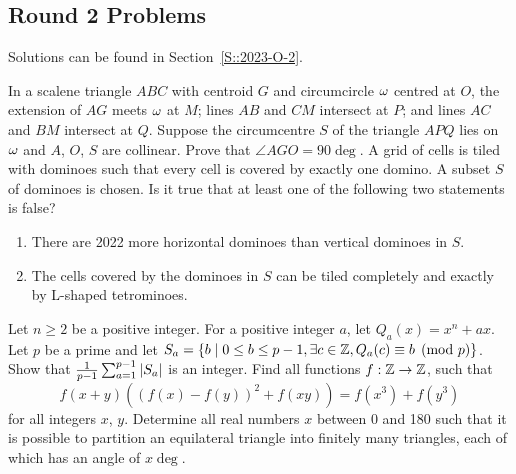 \subsection{Round 2 Problems}

Solutions can be found in Section~\ref{S::2023-O-2}.

\begin{enumerate}
    \hyperrefitem[Q::2023-O-2-1] In a scalene triangle $ABC$ with centroid $G$ and circumcircle $\omega$ centred at $O$, the extension of $AG$ meets $\omega$ at $M$; lines $AB$ and $CM$ intersect at $P$; and lines $AC$ and $BM$ intersect at $Q$. Suppose the circumcentre $S$ of the triangle $APQ$ lies on $\omega$ and $A$, $O$, $S$ are collinear. Prove that $\angle AGO = 90\deg$.
    \hyperrefitem[Q::2023-O-2-2] A grid of cells is tiled with dominoes such that every cell is covered by exactly one domino. A subset $S$ of dominoes is chosen. Is it true that at least one of the following two statements is false?
    \begin{enumerate}
        \item There are 2022 more horizontal dominoes than vertical dominoes in $S$.
        \item The cells covered by the dominoes in $S$ can be tiled completely and exactly by L-shaped tetrominoes.
    \end{enumerate}
    \hyperrefitem[Q::2023-O-2-3] Let $n \geq 2$ be a positive integer. For a positive integer $a$, let $Q_a(x) = x^n + ax$. Let $p$ be a prime and let $S_a = \left\lbrace b \mid 0 \leq b \leq p - 1, \exists c \in \mathbb{Z}, Q_a(c) \equiv b \pmod{p} \right\rbrace$. Show that $\frac{1}{p-1} \sum_{a=1}^{p-1} \left\lvert S_a \right\rvert$ is an integer.
    \hyperrefitem[Q::2023-O-2-4] Find all functions $f : \mathbb{Z} \to \mathbb{Z}$, such that \[f(x+y)((f(x) - f(y))^2 + f(xy)) = f(x^3) + f(y^3)\] for all integers $x$, $y$.
    \hyperrefitem[Q::2023-O-2-5] Determine all real numbers $x$ between 0 and 180 such that it is possible to partition an equilateral triangle into finitely many triangles, each of which has an angle of $x\deg$.
\end{enumerate}
